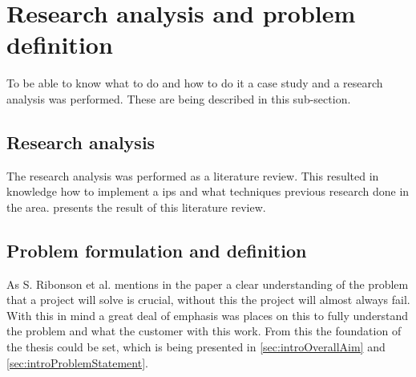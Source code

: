 \section{Research analysis and problem definition}\label{sec:methodProblemDefinition}
To be able to know what to do and how to do it a case study and a research analysis was performed.
These are being described in this sub-section.


\subsection{Research analysis}\label{sec:}
The research analysis was performed as a literature review. 
This resulted in knowledge how to implement a \acrlong{ips} and what techniques previous research done in the area.
 presents the result of this literature review.


\subsection{Problem formulation and definition}\label{sec:}
As S. Ribonson et al. mentions in the paper \cite{SecretsSuccessfulSimulation1995} a clear understanding of the problem that a project will solve is crucial, without this the project will almost always fail.
With this in mind a great deal of emphasis was places on this to fully understand the problem and what the customer with this work.
From this the foundation of the thesis could be set, which is being presented in \cref{sec:introOverallAim} and \ref{sec:introProblemStatement}.
